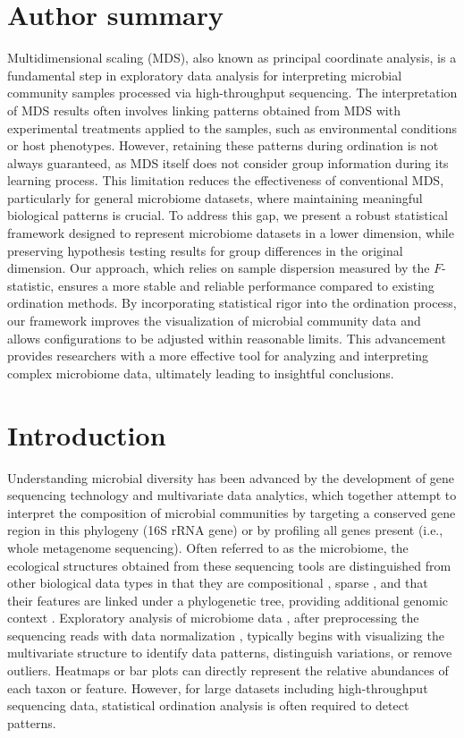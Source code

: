 \documentclass[10pt,letterpaper]{article}
\newcommand{\1}{{\rm 1}\kern-0.24em{\rm I}}
\begin{document}
\section*{Author summary}
Multidimensional scaling (MDS), also known as principal coordinate analysis, is a fundamental step in exploratory data analysis for interpreting microbial community samples processed via high-throughput sequencing. The interpretation of MDS results often involves linking patterns obtained from MDS with experimental treatments applied to the samples, such as environmental conditions or host phenotypes. However, retaining these patterns during ordination is not always guaranteed, as MDS itself does not consider group information during its learning process. This limitation reduces the effectiveness of conventional MDS, particularly for general microbiome datasets, where maintaining meaningful biological patterns is crucial. To address this gap, we present a robust statistical framework designed to represent microbiome datasets in a lower dimension, while preserving hypothesis testing results for group differences in the original dimension. Our approach, which relies on sample dispersion measured by the $F$-statistic, ensures a more stable and reliable performance compared to existing ordination methods. By incorporating statistical rigor into the ordination process, our framework improves the visualization of microbial community data and allows configurations to be adjusted within reasonable limits. This advancement provides researchers with a more effective tool for analyzing and interpreting complex microbiome data, ultimately leading to insightful conclusions.

\linenumbers

\section*{Introduction}
Understanding microbial diversity has been advanced by the development of gene sequencing technology and multivariate data analytics, which together attempt to interpret the composition of microbial communities by targeting a conserved gene region in this phylogeny (16S rRNA gene) or by profiling all genes present (i.e., whole metagenome sequencing). 
Often referred to as the microbiome, the ecological structures obtained from these sequencing tools are distinguished from other biological data types in that they are compositional \cite{Greenacre21, Gloor17}, sparse \cite{Martino19}, and that their features are linked under a phylogenetic tree, providing additional genomic context \cite{Martin02, Armstrong22}.
Exploratory analysis of microbiome data \cite{peterson24, Armstrong22}, after preprocessing the sequencing reads with data normalization \cite{Lin20, Weiss17, McMurdie14, paulson13}, typically begins with visualizing the multivariate structure to identify data patterns, distinguish variations, or remove outliers.
Heatmaps or bar plots can directly represent the relative abundances of each taxon or feature. However, for large datasets including high-throughput sequencing data, statistical ordination analysis is often required to detect patterns.
\end{document}
